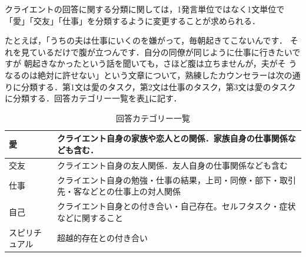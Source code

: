 \documentclass[shuuron]{kuee}
\begin{document}
クライエントの回答に関する分類に関しては，1発言単位ではなく1文単位で「愛」「交友」「仕事」を分類するように変更することが求められる．

たとえば，「うちの夫は仕事にいくのを嫌がって，毎朝起きてこないんです．
それを見ているだけで腹が立つんです．自分の同僚が同じように仕事に行きたいですが
朝起きなかったという話を聞いても，さほど腹は立ちませんが，夫がそ
うなるのは絶対に許せない」という文章について，熟練したカウンセラーは次の通りに分類する．第1文は愛のタスク，第2文は仕事のタスク，第3文は愛のタスクに分類する．回答カテゴリー一覧を表\ref{table:ansCate}に記す．

\begin{table}
  \caption{回答カテゴリー一覧}
  \label{table:ansCate}
  \begin{center}
    \begin{tabular}{|l|p{7cm}|} \hline
      愛 & クライエント自身の家族や恋人との関係．家族自身の仕事関係なども含む．

      \\ \hline
      交友  & クライエント自身の友人関係．友人自身の仕事関係なども含む

      \\ \hline
      仕事 & クライエント自身の勉強・仕事の結果，上司・同僚・部下・取引先・客などとの仕事上の対人関係

      \\ \hline
      自己  &  クライエント自身との付き合い・自己存在。セルフタスク・症状などに関すること
      \\ \hline
      スピリチュアル & 超越的存在との付き合い
      \\ \hline
    \end{tabular}
  \end{center}
\end{table}

\end{document}
